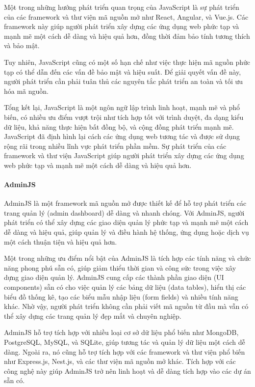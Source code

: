Một trong những hướng phát triển quan trọng của JavaScript là sự phát triển của các framework và thư viện mã nguồn mở như React, Angular, và Vue.js. Các framework này giúp người phát triển xây dựng các ứng dụng web phức tạp và mạnh mẽ một cách dễ dàng và hiệu quả hơn, đồng thời đảm bảo tính tương thích và bảo mật.

Tuy nhiên, JavaScript cũng có một số hạn chế như việc thực hiện mã nguồn phức tạp có thể dẫn đến các vấn đề bảo mật và hiệu suất. Để giải quyết vấn đề này, người phát triển cần phải tuân thủ các nguyên tắc phát triển an toàn và tối ưu hóa mã nguồn.

Tổng kết lại, JavaScript là một ngôn ngữ lập trình linh hoạt, mạnh mẽ và phổ biến, có nhiều ưu điểm vượt trội như tích hợp tốt với trình duyệt, đa dạng kiểu dữ liệu, khả năng thực hiện bất đồng bộ, và cộng đồng phát triển mạnh mẽ. JavaScript đã định hình lại cách các ứng dụng web tương tác và được sử dụng rộng rãi trong nhiều lĩnh vực phát triển phần mềm. Sự phát triển của các framework và thư viện JavaScript giúp người phát triển xây dựng các ứng dụng web phức tạp và mạnh mẽ một cách dễ dàng và hiệu quả hơn.

\paragraph{AdminJS}
\mbox{}

AdminJS là một framework mã nguồn mở được thiết kế để hỗ trợ phát triển các trang quản lý (admin dashboard) dễ dàng và nhanh chóng. Với AdminJS, người phát triển có thể xây dựng các giao diện quản lý phức tạp và mạnh mẽ một cách dễ dàng và hiệu quả, giúp quản lý và điều hành hệ thống, ứng dụng hoặc dịch vụ một cách thuận tiện và hiệu quả hơn.

Một trong những ưu điểm nổi bật của AdminJS là tích hợp các tính năng và chức năng phong phú sẵn có, giúp giảm thiểu thời gian và công sức trong việc xây dựng giao diện quản lý. AdminJS cung cấp các thành phần giao diện (UI components) sẵn có cho việc quản lý các bảng dữ liệu (data tables), hiển thị các biểu đồ thống kê, tạo các biểu mẫu nhập liệu (form fields) và nhiều tính năng khác. Nhờ vậy, người phát triển không cần phải viết mã nguồn từ đầu mà vẫn có thể xây dựng các trang quản lý đẹp mắt và chuyên nghiệp.

AdminJS hỗ trợ tích hợp với nhiều loại cơ sở dữ liệu phổ biến như MongoDB, PostgreSQL, MySQL, và SQLite, giúp tương tác và quản lý dữ liệu một cách dễ dàng. Ngoài ra, nó cũng hỗ trợ tích hợp với các framework và thư viện phổ biến như Express.js, Nest.js, và các thư viện mã nguồn mở khác. Tích hợp với các công nghệ này giúp AdminJS trở nên linh hoạt và dễ dàng tích hợp vào các dự án sẵn có.

